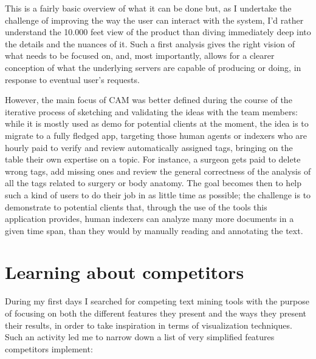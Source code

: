\documentclass[12pt,svgnames]{memoir}
\begin{document}
This is a fairly basic overview of what it can be done but, as I
undertake the challenge of improving the way the user can interact with
the system, I'd rather understand the 10.000 feet view of the product
than diving immediately deep into the details and the nuances of it.
Such a first analysis gives the right vision of what needs to be focused
on, and, most importantly, allows for a clearer conception of what the
underlying servers are capable of producing or doing, in response to
eventual user's requests.

However, the main focus of CAM was better defined during the course of
the iterative process of sketching and validating the ideas with the
team members: while it is mostly used as demo for potential clients at
the moment, the idea is to migrate to a fully fledged app, targeting
those human agents or indexers who are hourly paid to verify and review
automatically assigned tags, bringing on the table their own expertise
on a topic. For instance, a surgeon gets paid to delete wrong tags, add
missing ones and review the general correctness of the analysis of all
the tags related to surgery or body anatomy. The goal becomes then to
help such a kind of users to do their job in as little time as possible;
the challenge is to demonstrate to potential clients that, through the
use of the tools this application provides, human indexers can analyze
many more documents in a given time span, than they would by manually
reading and annotating the text.

\section{Learning about competitors}\label{learning-about-competitors}

During my first days I searched for competing text mining tools with the
purpose of focusing on both the different features they present and the
ways they present their results, in order to take inspiration in terms
of visualization techniques. Such an activity led me to narrow down a
list of very simplified features competitors implement:
\end{document}
